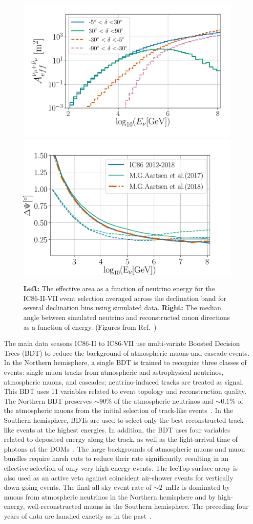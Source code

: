 \documentclass[aps,10pt,prd,twocolumn,floats,letterpaper,showpacs,nofootinbib,bibnotes,notitlepage,superscriptaddress,floatfix]{revtex4-1}
\begin{document}
\begin{figure}[t]
\centering
\includegraphics[width=0.51\linewidth,viewport= 20 20 500 330, clip=true]{IC86II_effA.pdf}\hfill\includegraphics[width=0.48\linewidth,viewport= 0 0 480 310, clip=true]{IC86II_PSF.pdf}
\caption[]{{\bf Left:} The effective area as a function of neutrino energy for the IC86-II-VII event selection averaged across the declination band for several declination bins using simulated data. {\bf Right:} The median angle between simulated neutrino and reconstructed muon directions as a function of energy. (Figures from Ref.~\cite{Aartsen:2019fau})}\label{fig:effAand PSF}
\end{figure}

The main data seasons IC86-II to IC86-VII use multi-variate Boosted Decision Trees (BDT) to reduce the background of atmospheric muons and cascade events. In the Northern hemisphere, a single BDT is trained to recognize three classes of events: single muon tracks from atmospheric and astrophysical neutrinos, atmospheric muons, and cascades; neutrino-induced tracks are treated as signal. This BDT uses 11 variables related to event topology and reconstruction quality. The Northern BDT preserves $\sim90\%$ of the atmospheric neutrinos and $\sim0.1\%$ of the atmospheric muons from the initial selection of track-like events~\cite{Aartsen:2016oji,Aartsen:2018ywr,Aartsen:2019fau}. In the Southern hemisphere, BDTs are used to select only the best-reconstructed track-like events at the highest energies. In addition, the BDT uses four variables related to deposited energy along the track, as well as the light-arrival time of photons at the DOMs~\cite{Aartsen:2014cva,Aartsen:2016oji}. The large backgrounds of atmospheric muons and muon bundles require harsh cuts to reduce their rate significantly, resulting in an effective selection of only very high energy events. The IceTop surface array is also used as an active veto against coincident air-shower events for vertically down-going events. The final all-sky event rate of $\sim2$~mHz is dominated by muons from atmospheric neutrinos in the Northern hemisphere and by high-energy, well-reconstructed muons in the Southern hemisphere. The preceding four years of data are handled exactly as in the past~\cite{Abbasi:2010rd,Aartsen:2013uuv,Schatto:2014kbj,Aartsen:2014cva}.
\end{document}
